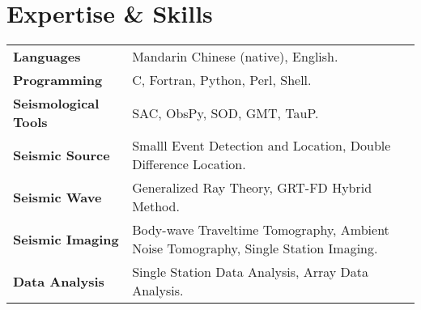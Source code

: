 \section*{Expertise \& Skills}

\begin{tabular}{p{} p{}}
\textbf{Languages} & Mandarin Chinese (native), English. \\
\textbf{Programming} & C, Fortran, Python, Perl, Shell. \\
\textbf{Seismological Tools} & SAC, ObsPy, SOD, GMT, TauP. \\
\textbf{Seismic Source} & Smalll Event Detection and Location, Double Difference Location. \\
\textbf{Seismic Wave} & Generalized Ray Theory, GRT-FD Hybrid Method. \\
\textbf{Seismic Imaging} & Body-wave Traveltime Tomography, Ambient Noise Tomography, Single Station Imaging. \\
\textbf{Data Analysis} & Single Station Data Analysis, Array Data Analysis. \\
\end{tabular}
